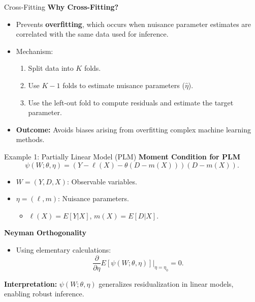 \documentclass[xcolor=svgnames,t]{beamer}
\begin{document}
                        \begin{frame}{Cross-Fitting}
                        \textbf{Why Cross-Fitting?}
                        \begin{itemize}
                            \item Prevents \textbf{overfitting}, which occurs when nuisance parameter estimates are correlated with the same data used for inference.
                            \pause
                            \item Mechanism:
                            \begin{enumerate}
                                \item Split data into \(K\) folds.
                                \item Use \(K-1\) folds to estimate nuisance parameters (\(\hat{\eta}\)).
                                \item Use the left-out fold to compute residuals and estimate the target parameter.
                            \end{enumerate}
                            \pause
                            \item \textbf{Outcome:} Avoids biases arising from overfitting complex machine learning methods.
                        \end{itemize}
                        \end{frame}
                        
                        \begin{frame}{Example 1: Partially Linear Model (PLM)}
                        \textbf{Moment Condition for PLM}
                        \[
                        \psi(W; \theta, \eta) = \left(Y - \ell(X) - \theta(D - m(X))\right)(D - m(X)).
                        \]
                        \begin{itemize}
                            \item \(W = (Y, D, X)\): Observable variables.
                            \item \(\eta = (\ell, m)\): Nuisance parameters.
                            \begin{itemize}
                                \item \(\ell(X) = E[Y | X]\), \(m(X) = E[D | X]\).
                            \end{itemize}
                        \end{itemize}
                        \pause
                        \textbf{Neyman Orthogonality}
                        \begin{itemize}
                            \item Using elementary calculations:
                            \[
                            \frac{\partial}{\partial \eta} E[\psi(W; \theta, \eta)]\big|_{\eta=\eta_0} = 0.
                            \]
                        \end{itemize}
                        \pause
                        \textbf{Interpretation:} \(\psi(W; \theta, \eta)\) generalizes residualization in linear models, enabling robust inference.
                        \end{frame}
                        
\end{document}
